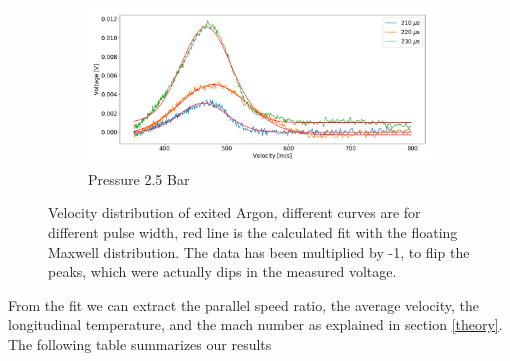 \documentclass[a4paper,10pt]{article}
\begin{document}
\begin{figure}[H]
  ~
  \begin{subfigure}[t]{0.49 \textwidth}
    \centering
    \includegraphics[width=\textwidth]{tof15}
    \caption{Pressure 2.5 Bar}\label{tof4}
  \end{subfigure}
  \caption{Velocity distribution of exited Argon, different curves are for different pulse width, red line is the calculated fit with the floating Maxwell distribution. The data has been multiplied by -1, to flip the peaks, which were actually dips in the measured voltage. }
  \label{tof}
\end{figure}

From the fit we can extract the parallel speed ratio, the average velocity, the longitudinal temperature, and the mach number as explained in section \ref{theory}. The following table summarizes our results
\end{document}
